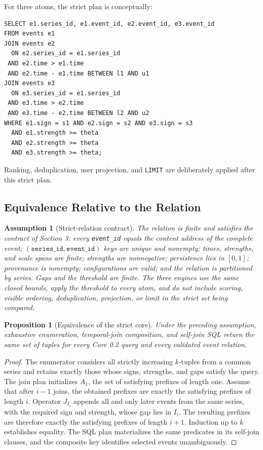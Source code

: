 \documentclass[11pt,a4paper]{article}
\newtheorem{proposition}{Proposition}
\newtheorem{assumption}{Assumption}
\newcommand{\code}[1]{\texttt{#1}}
\begin{document}
For three atoms, the strict plan is conceptually:
\begin{lstlisting}
SELECT e1.series_id, e1.event_id, e2.event_id, e3.event_id
FROM events e1
JOIN events e2
  ON e2.series_id = e1.series_id
 AND e2.time > e1.time
 AND e2.time - e1.time BETWEEN l1 AND u1
JOIN events e3
  ON e3.series_id = e1.series_id
 AND e3.time > e2.time
 AND e3.time - e2.time BETWEEN l2 AND u2
WHERE e1.sign = s1 AND e2.sign = s2 AND e3.sign = s3
  AND e1.strength >= theta
  AND e2.strength >= theta
  AND e3.strength >= theta;
\end{lstlisting}
Ranking, deduplication, user projection, and \code{LIMIT} are deliberately applied after this strict plan.

\subsection{Equivalence Relative to the Relation}

\begin{assumption}[Strict-relation contract]
The relation is finite and satisfies the contract of Section 3: every \code{event\_id} equals the content address of the complete event; $(\code{series\_id},\code{event\_id})$ keys are unique and nonempty; times, strengths, and scale spans are finite; strengths are nonnegative; persistence lies in $[0,1]$; provenance is nonempty; configurations are valid; and the relation is partitioned by series. Gaps and the threshold are finite. The three engines use the same closed bounds, apply the threshold to every atom, and do not include scoring, visible ordering, deduplication, projection, or limit in the strict set being compared.
\end{assumption}

\begin{proposition}[Equivalence of the strict core]
Under the preceding assumption, exhaustive enumeration, temporal-join composition, and self-join SQL return the same set of tuples for every Core 0.2 query and every validated event relation.
\end{proposition}

\begin{proof}
The enumerator considers all strictly increasing $k$-tuples from a common series and retains exactly those whose signs, strengths, and gaps satisfy the query. The join plan initializes $A_1$, the set of satisfying prefixes of length one. Assume that after $i-1$ joins, the obtained prefixes are exactly the satisfying prefixes of length $i$. Operator $J_{I_i}$ appends all and only later events from the same series, with the required sign and strength, whose gap lies in $I_i$. The resulting prefixes are therefore exactly the satisfying prefixes of length $i+1$. Induction up to $k$ establishes equality. The SQL plan materializes the same predicates in its self-join clauses, and the composite key identifies selected events unambiguously.
\end{proof}
\end{document}
